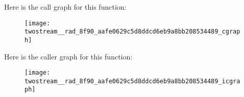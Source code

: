 Here is the call graph for this function\+:
\nopagebreak
\begin{figure}[H]
\begin{center}
\leavevmode
\texttt{[image: twostream\_\_rad\_8f90\_aafe0629c5d8ddcd6eb9a8bb208534489\_cgraph]}
\end{center}
\end{figure}
Here is the caller graph for this function\+:
\nopagebreak
\begin{figure}[H]
\begin{center}
\leavevmode
\texttt{[image: twostream\_\_rad\_8f90\_aafe0629c5d8ddcd6eb9a8bb208534489\_icgraph]}
\end{center}
\end{figure}
